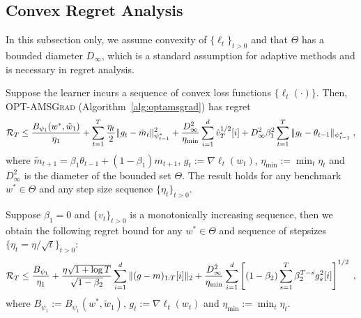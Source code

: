 \documentclass[wcp]{jmlr}
\begin{document}
\vspace{-0.05in}
\subsection{Convex Regret Analysis}\label{sec:convex}
\vspace{-0.05in}

In this subsection only, we assume convexity of $\{\ell_t\}_{t>0}$ and that $\Theta$ has a bounded diameter $D_{\infty}$, which is a standard assumption for adaptive methods \citep{RKK18,KB15} and is necessary in regret analysis.
\begin{Theorem} \label{THM:MAINCONVEX}\vspace{0.05in}
Suppose the learner incurs a sequence of convex loss functions $\{ \ell_{t}(\cdot) \}$.
Then,  \textsc{OPT-AMSGrad} (Algorithm~\ref{alg:optamsgrad}) has regret 
\begin{equation} \notag
\begin{split}
\mathcal{R}_T \leq    \frac{ B_{\psi_1}(w^*, \tilde{w}_{1})}{\eta_1}
+ \sum_{t=1}^T\frac{\eta_t}{2} \| g_t - \tilde{m}_t  \|_{\psi_{t-1}^*}^2 + \frac{D_{\infty}^2}{\eta_{\min}}  \sum_{i=1}^d \hat{v}_{T}^{1/2}[i] + D_{\infty}^2\beta_1^2   \sum_{t=1}^T  \| g_t - \theta_{t-1}  \|_{\psi_{t-1}^*}\eqsp,
\end{split}
\end{equation}
where $ \tilde{m}_{t+1}  = \beta_1 \theta_{t-1} +(1-\beta_1) m_{t+1}$, $g_{t}:= \nabla \ell_{t}(w_t)$, $\eta_{{\min}} := \min_{{t}} \eta_{t}$ and $D_{\infty}^2$ is the diameter of the bounded set $\Theta$.
The result holds for any benchmark $w^{*} \in \Theta$ and any step size sequence $\{ \eta_t \}_{t>0}$.
\end{Theorem}
\vspace{0.05in}
\begin{Corollary}\label{COR:COROLLARY}
Suppose $\beta_1=0$ and $\{v_t\}_{t>0}$ is a monotonically increasing sequence, then we obtain the following regret bound for any $w^{*} \in \Theta$ and sequence of stepsizes $\{ \eta_t = \eta/\sqrt{t}\}_{t>0}$: 
\begin{equation}\notag
\begin{split}
\mathcal{R}_T \leq  \frac{ B_{\psi_1}}{\eta_1}
+ \frac{\eta \sqrt{1 + \log T}}{\sqrt{1 - \beta_2}} \sum_{i=1}^d \| (g-m)_{1:T}[i] \|_2  +\frac{D_{\infty}^2}{\eta_{\min}} \sum_{i=1}^d \left[ (1-\beta_2) \sum_{s=1}^{T} \beta_2^{T-s} g^2_s[i] \right]^{1/2} \eqsp,
\end{split}
\end{equation}
where $B_{\psi_1} := B_{\psi_1}(w^*, \tilde{w}_{1})$, $g_{t}:= \nabla \ell_{t}(w_t)$ and $\eta_{{\min}} := \min_{{t}} \eta_{t}$.
\end{Corollary}
\end{document}
